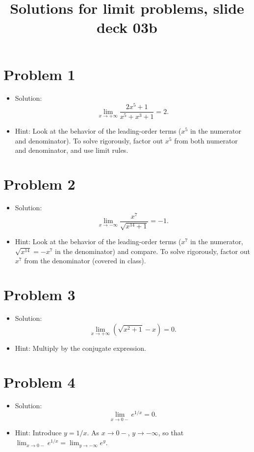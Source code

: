 \documentclass{amsart}
\title{Solutions for limit problems, slide deck 03b}
\begin{document}
\maketitle

\section*{Problem 1}

\begin{itemize}
\item Solution:
  \[
    \lim_{x \to +\infty} \frac{2x^5 + 1}{x^5 + x^3 + 1} = 2.
  \]
\item Hint: Look at the behavior of the leading-order terms ($x^5$ in the numerator and denominator). To solve rigorously, factor out $x^5$ from both numerator and denominator, and use limit rules.
\end{itemize}


\section*{Problem 2}

\begin{itemize}
\item Solution:
  \[
    \lim_{x \to -\infty} \frac{x^7}{\sqrt{x^{14} + 1}} = - 1.
  \]
\item Hint: Look at the behavior of the leading-order terms ($x^7$ in the numerator, $\sqrt{x^{14}} = - x^7$ in the denominator) and compare. To solve rigorously, factor out $x^7$ from the denominator (covered in class).
\end{itemize}


\section*{Problem 3}

\begin{itemize}
\item Solution:
  \[
    \lim_{x \to +\infty} \left(\sqrt{x^2 + 1} - x \right) = 0.
  \]
\item Hint: Multiply by the conjugate expression.
\end{itemize}


\section*{Problem 4}

\begin{itemize}
\item Solution:
  \[
    \lim_{x \to 0-} e^{1/x} = 0.
  \]
\item Hint: Introduce $y = 1/x$. As $x \to 0-$, $y \to -\infty$, so that $\displaystyle \lim_{x \to 0-} e^{1/x} = \lim_{y \to -\infty} e^y$.
\end{itemize}
\end{document}
